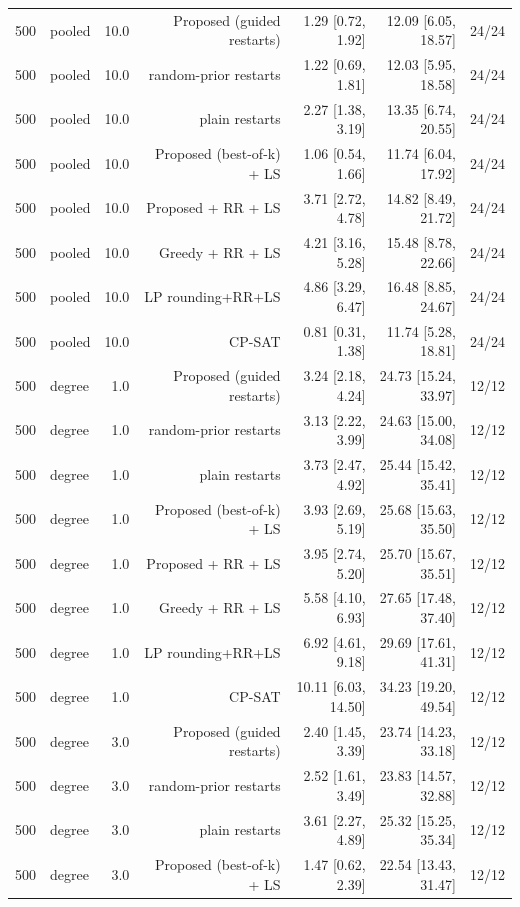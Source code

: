 \begin{table}[t]
\begin{tabular}{llrrrrr}
500 & pooled & 10.0 & Proposed (guided restarts) & 1.29 [0.72, 1.92] & 12.09 [6.05, 18.57] & 24/24 \\
500 & pooled & 10.0 & random-prior restarts & 1.22 [0.69, 1.81] & 12.03 [5.95, 18.58] & 24/24 \\
500 & pooled & 10.0 & plain restarts & 2.27 [1.38, 3.19] & 13.35 [6.74, 20.55] & 24/24 \\
500 & pooled & 10.0 & Proposed (best-of-k) + LS & 1.06 [0.54, 1.66] & 11.74 [6.04, 17.92] & 24/24 \\
500 & pooled & 10.0 & Proposed + RR + LS & 3.71 [2.72, 4.78] & 14.82 [8.49, 21.72] & 24/24 \\
500 & pooled & 10.0 & Greedy + RR + LS & 4.21 [3.16, 5.28] & 15.48 [8.78, 22.66] & 24/24 \\
500 & pooled & 10.0 & LP rounding+RR+LS & 4.86 [3.29, 6.47] & 16.48 [8.85, 24.67] & 24/24 \\
500 & pooled & 10.0 & CP-SAT & 0.81 [0.31, 1.38] & 11.74 [5.28, 18.81] & 24/24 \\
500 & degree & 1.0 & Proposed (guided restarts) & 3.24 [2.18, 4.24] & 24.73 [15.24, 33.97] & 12/12 \\
500 & degree & 1.0 & random-prior restarts & 3.13 [2.22, 3.99] & 24.63 [15.00, 34.08] & 12/12 \\
500 & degree & 1.0 & plain restarts & 3.73 [2.47, 4.92] & 25.44 [15.42, 35.41] & 12/12 \\
500 & degree & 1.0 & Proposed (best-of-k) + LS & 3.93 [2.69, 5.19] & 25.68 [15.63, 35.50] & 12/12 \\
500 & degree & 1.0 & Proposed + RR + LS & 3.95 [2.74, 5.20] & 25.70 [15.67, 35.51] & 12/12 \\
500 & degree & 1.0 & Greedy + RR + LS & 5.58 [4.10, 6.93] & 27.65 [17.48, 37.40] & 12/12 \\
500 & degree & 1.0 & LP rounding+RR+LS & 6.92 [4.61, 9.18] & 29.69 [17.61, 41.31] & 12/12 \\
500 & degree & 1.0 & CP-SAT & 10.11 [6.03, 14.50] & 34.23 [19.20, 49.54] & 12/12 \\
500 & degree & 3.0 & Proposed (guided restarts) & 2.40 [1.45, 3.39] & 23.74 [14.23, 33.18] & 12/12 \\
500 & degree & 3.0 & random-prior restarts & 2.52 [1.61, 3.49] & 23.83 [14.57, 32.88] & 12/12 \\
500 & degree & 3.0 & plain restarts & 3.61 [2.27, 4.89] & 25.32 [15.25, 35.34] & 12/12 \\
500 & degree & 3.0 & Proposed (best-of-k) + LS & 1.47 [0.62, 2.39] & 22.54 [13.43, 31.47] & 12/12 \\

\end{tabular}
\end{table}
